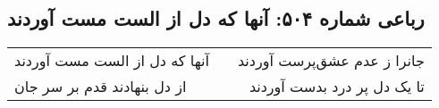 \begin{center}
\section*{رباعی شماره ۵۰۴: آنها که دل از الست مست آوردند}
\label{sec:0504}
\begin{longtable}{l p{0.5cm} r}
آنها که دل از الست مست آوردند
&&
جانرا ز عدم عشق‌پرست آوردند
\\
از دل بنهادند قدم بر سر جان
&&
تا یک دل پر درد بدست آوردند
\\
\end{longtable}
\end{center}
